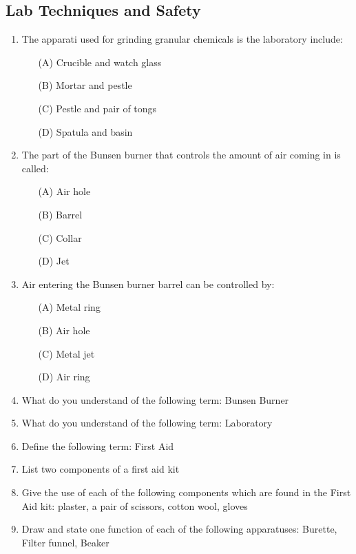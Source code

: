 \subsection{Lab Techniques and Safety}

\begin{enumerate}
	\item The apparati used for grinding granular chemicals is the laboratory include:
	\begin{enumerate}[topsep=0ex,itemsep=0ex,partopsep=1ex,parsep=1ex]
		\item[(A)] Crucible and watch glass
		\item[(B)] Mortar and pestle
		\item[(C)] Pestle and pair of tongs
		\item[(D)] Spatula and basin
	\end{enumerate}
	
	\item The part of the Bunsen burner that controls the amount of air coming in is called:
	\begin{enumerate}[topsep=0ex,itemsep=0ex,partopsep=1ex,parsep=1ex]
		\item[(A)] Air hole
		\item[(B)] Barrel
		\item[(C)] Collar
		\item[(D)] Jet
	\end{enumerate}
	
	\item Air entering the Bunsen burner barrel can be controlled by:
		\begin{enumerate}[topsep=0ex,itemsep=0ex,partopsep=1ex,parsep=1ex]
		\item[(A)] Metal ring
		\item[(B)] Air hole
		\item[(C)] Metal jet
		\item[(D)] Air ring
	\end{enumerate}
	
	\item What do you understand of the following term: Bunsen Burner
	
	\item What do you understand of the following term: Laboratory
	
	\item Define the following term: First Aid
	
	\item List two components of a first aid kit
	
	\item Give the use of each of the following components which are found in the First Aid kit: plaster, a pair of scissors, cotton wool, gloves
	
	\item Draw and state one function of each of the following apparatuses: Burette, Filter funnel, Beaker
\end{enumerate}